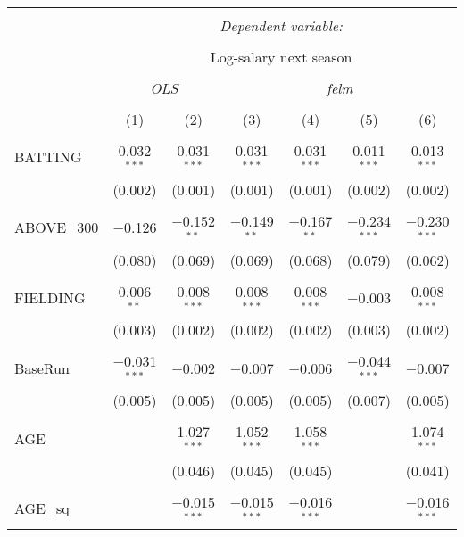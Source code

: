 
\begin{table}[!htbp] \centering
  \caption{}
  \label{}
  \scriptsize
\begin{tabular}{@{\extracolsep{5pt}}lcccccc}
\\[-1.8ex]\hline
\hline \\[-1.8ex]
 & \multicolumn{6}{c}{\textit{Dependent variable:}} \\
\cline{2-7}
\\[-1.8ex] & \multicolumn{6}{c}{Log-salary next season} \\
\\[-1.8ex] & \multicolumn{2}{c}{\textit{OLS}} & \multicolumn{4}{c}{\textit{felm}} \\
\\[-1.8ex] & (1) & (2) & (3) & (4) & (5) & (6)\\
\hline \\[-1.8ex]
 BATTING & 0.032$^{***}$ & 0.031$^{***}$ & 0.031$^{***}$ & 0.031$^{***}$ & 0.011$^{***}$ & 0.013$^{***}$ \\
  & (0.002) & (0.001) & (0.001) & (0.001) & (0.002) & (0.002) \\
  & & & & & & \\
 ABOVE\_300 & $-$0.126 & $-$0.152$^{**}$ & $-$0.149$^{**}$ & $-$0.167$^{**}$ & $-$0.234$^{***}$ & $-$0.230$^{***}$ \\
  & (0.080) & (0.069) & (0.069) & (0.068) & (0.079) & (0.062) \\
  & & & & & & \\
 FIELDING & 0.006$^{**}$ & 0.008$^{***}$ & 0.008$^{***}$ & 0.008$^{***}$ & $-$0.003 & 0.008$^{***}$ \\
  & (0.003) & (0.002) & (0.002) & (0.002) & (0.003) & (0.002) \\
  & & & & & & \\
 BaseRun & $-$0.031$^{***}$ & $-$0.002 & $-$0.007 & $-$0.006 & $-$0.044$^{***}$ & $-$0.007 \\
  & (0.005) & (0.005) & (0.005) & (0.005) & (0.007) & (0.005) \\
  & & & & & & \\
 AGE &  & 1.027$^{***}$ & 1.052$^{***}$ & 1.058$^{***}$ &  & 1.074$^{***}$ \\
  &  & (0.046) & (0.045) & (0.045) &  & (0.041) \\
  & & & & & & \\
 AGE\_sq &  & $-$0.015$^{***}$ & $-$0.015$^{***}$ & $-$0.016$^{***}$ &  & $-$0.016$^{***}$ \\

\end{tabular}
\end{table}
